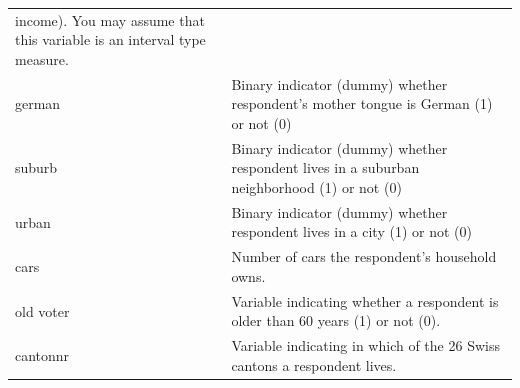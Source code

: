 \documentclass[]{article}
\theoremstyle{definition}
\theoremstyle{definition}
\theoremstyle{definition}
\theoremstyle{remark}
\begin{document}
\begin{longtable}[]{@{}ll@{}}
\begin{minipage}[t]{0.83\columnwidth}
income). You may assume that this variable is an interval type
measure.\strut
\end{minipage}\tabularnewline
\begin{minipage}[t]{0.11\columnwidth}\raggedright\strut
german\strut
\end{minipage} & \begin{minipage}[t]{0.83\columnwidth}\raggedright\strut
Binary indicator (dummy) whether respondent's mother tongue is German
(1) or not (0)\strut
\end{minipage}\tabularnewline
\begin{minipage}[t]{0.11\columnwidth}\raggedright\strut
suburb\strut
\end{minipage} & \begin{minipage}[t]{0.83\columnwidth}\raggedright\strut
Binary indicator (dummy) whether respondent lives in a suburban
neighborhood (1) or not (0)\strut
\end{minipage}\tabularnewline
\begin{minipage}[t]{0.11\columnwidth}\raggedright\strut
urban\strut
\end{minipage} & \begin{minipage}[t]{0.83\columnwidth}\raggedright\strut
Binary indicator (dummy) whether respondent lives in a city (1) or not
(0)\strut
\end{minipage}\tabularnewline
\begin{minipage}[t]{0.11\columnwidth}\raggedright\strut
cars\strut
\end{minipage} & \begin{minipage}[t]{0.83\columnwidth}\raggedright\strut
Number of cars the respondent's household owns.\strut
\end{minipage}\tabularnewline
\begin{minipage}[t]{0.11\columnwidth}\raggedright\strut
old voter\strut
\end{minipage} & \begin{minipage}[t]{0.83\columnwidth}\raggedright\strut
Variable indicating whether a respondent is older than 60 years (1) or
not (0).\strut
\end{minipage}\tabularnewline
\begin{minipage}[t]{0.11\columnwidth}\raggedright\strut
cantonnr\strut
\end{minipage} & \begin{minipage}[t]{0.83\columnwidth}\raggedright\strut
Variable indicating in which of the 26 Swiss cantons a respondent
lives.\strut
\end{minipage}\tabularnewline

\end{longtable}
\end{document}
